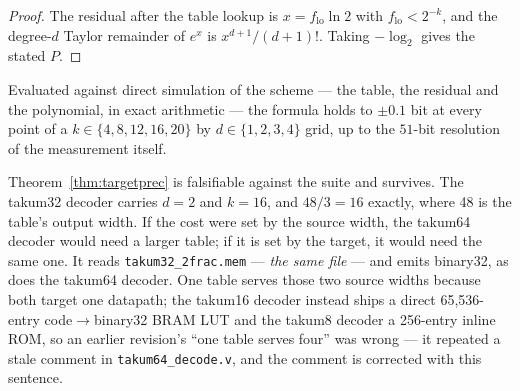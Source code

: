 \begin{proof}
The residual after the table lookup is $x = f_{\mathrm{lo}}\ln 2$ with
$f_{\mathrm{lo}} < 2^{-k}$, and the degree-$d$ Taylor remainder of $e^{x}$ is
$x^{d+1}/(d+1)!$. Taking $-\log_2$ gives the stated $P$.
\end{proof}

Evaluated against direct simulation of the scheme --- the table, the residual and
the polynomial, in exact arithmetic --- the formula holds to $\pm 0.1$ bit at every
point of a $k \in \{4,8,12,16,20\}$ by $d \in \{1,2,3,4\}$ grid, up to the
$51$-bit resolution of the measurement itself.

Theorem~\ref{thm:targetprec} is falsifiable against the suite and survives. The
takum32 decoder carries $d = 2$ and $k = 16$, and $48/3 = 16$ exactly, where 48 is
the table's output width. If the cost were set by the source width, the takum64
decoder would need a larger table; if it is set by the target, it would need the
same one. It reads \texttt{takum32\_2frac.mem} --- \emph{the same file} --- and
emits binary32, as does the takum64 decoder. One table serves those two source
widths because both target one datapath; the takum16 decoder instead ships a
direct 65,536-entry code$\to$binary32 BRAM LUT and the takum8 decoder a
256-entry inline ROM, so an earlier revision's ``one table serves four'' was
wrong --- it repeated a stale comment in \texttt{takum64\_decode.v}, and the
comment is corrected with this sentence.

